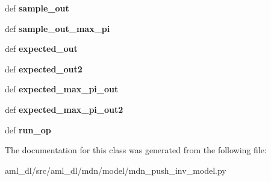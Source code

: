 \begin{DoxyCompactItemize}
\item 
\hypertarget{classsrc_1_1aml__dl_1_1mdn_1_1model_1_1mdn__push__inv__model_1_1_m_d_n_push_inverse_model_a5f91c39dde063066dd7e9c19bd722e24}{def {\bfseries sample\-\_\-out}}\label{classsrc_1_1aml__dl_1_1mdn_1_1model_1_1mdn__push__inv__model_1_1_m_d_n_push_inverse_model_a5f91c39dde063066dd7e9c19bd722e24}

\item 
\hypertarget{classsrc_1_1aml__dl_1_1mdn_1_1model_1_1mdn__push__inv__model_1_1_m_d_n_push_inverse_model_a3345df28ac1a840c6f03d4b5c41e29b5}{def {\bfseries sample\-\_\-out\-\_\-max\-\_\-pi}}\label{classsrc_1_1aml__dl_1_1mdn_1_1model_1_1mdn__push__inv__model_1_1_m_d_n_push_inverse_model_a3345df28ac1a840c6f03d4b5c41e29b5}

\item 
\hypertarget{classsrc_1_1aml__dl_1_1mdn_1_1model_1_1mdn__push__inv__model_1_1_m_d_n_push_inverse_model_a181930a502d9dffbc9991fc64ef6de3c}{def {\bfseries expected\-\_\-out}}\label{classsrc_1_1aml__dl_1_1mdn_1_1model_1_1mdn__push__inv__model_1_1_m_d_n_push_inverse_model_a181930a502d9dffbc9991fc64ef6de3c}

\item 
\hypertarget{classsrc_1_1aml__dl_1_1mdn_1_1model_1_1mdn__push__inv__model_1_1_m_d_n_push_inverse_model_a090b9b57530948defc6dfd84565974be}{def {\bfseries expected\-\_\-out2}}\label{classsrc_1_1aml__dl_1_1mdn_1_1model_1_1mdn__push__inv__model_1_1_m_d_n_push_inverse_model_a090b9b57530948defc6dfd84565974be}

\item 
\hypertarget{classsrc_1_1aml__dl_1_1mdn_1_1model_1_1mdn__push__inv__model_1_1_m_d_n_push_inverse_model_abfbd2a009b491fabfb97510edf8b56fa}{def {\bfseries expected\-\_\-max\-\_\-pi\-\_\-out}}\label{classsrc_1_1aml__dl_1_1mdn_1_1model_1_1mdn__push__inv__model_1_1_m_d_n_push_inverse_model_abfbd2a009b491fabfb97510edf8b56fa}

\item 
\hypertarget{classsrc_1_1aml__dl_1_1mdn_1_1model_1_1mdn__push__inv__model_1_1_m_d_n_push_inverse_model_a360873a32d12e8ce6af70893574858fb}{def {\bfseries expected\-\_\-max\-\_\-pi\-\_\-out2}}\label{classsrc_1_1aml__dl_1_1mdn_1_1model_1_1mdn__push__inv__model_1_1_m_d_n_push_inverse_model_a360873a32d12e8ce6af70893574858fb}

\item 
\hypertarget{classsrc_1_1aml__dl_1_1mdn_1_1model_1_1mdn__push__inv__model_1_1_m_d_n_push_inverse_model_a6db3c40894066dcef507f3e0ae0cb63c}{def {\bfseries run\-\_\-op}}\label{classsrc_1_1aml__dl_1_1mdn_1_1model_1_1mdn__push__inv__model_1_1_m_d_n_push_inverse_model_a6db3c40894066dcef507f3e0ae0cb63c}

\end{DoxyCompactItemize}


The documentation for this class was generated from the following file\-:\begin{DoxyCompactItemize}
\item 
aml\-\_\-dl/src/aml\-\_\-dl/mdn/model/mdn\-\_\-push\-\_\-inv\-\_\-model.\-py\end{DoxyCompactItemize}
